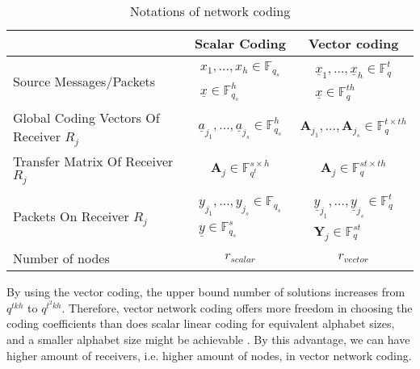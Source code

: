 \begin{table}[H]
\caption{Notations of network coding}

\label{tab:notations} 

\begin{tabular}{|>{\centering}p{0.2\paperwidth}|c|c|}
\hline 
 & Scalar Coding & Vector coding\tabularnewline
\hline 
\hline 
Source Messages/Packets & $\begin{array}{c}
x_{1},\ldots,x_{h}\in\ensuremath{\mathbb{F}}_{q_{s}}\\
\underline{x}\in\ensuremath{\mathbb{F}}_{q_{s}}^{h}
\end{array}$ & $\begin{array}{c}
\underline{x}_{1},\ldots,\underline{x}_{h}\in\ensuremath{\mathbb{F}}_{q}^{t}\\
\underline{x}\in\ensuremath{\mathbb{F}}_{q}^{th}
\end{array}$\tabularnewline
\hline 
Global Coding Vectors Of Receiver $R_{j}$ & $\underline{a}_{j_{1}},\ldots,\underline{a}_{j_{s}}\in\ensuremath{\mathbb{F}}_{q_{s}}^{h}$ & $\boldsymbol{A}_{j_{1}},\ldots,\boldsymbol{A}_{j_{s}}\in\ensuremath{\mathbb{F}}_{q}^{t\times th}$\tabularnewline
\hline 
Transfer Matrix Of Receiver $R_{j}$ & $\boldsymbol{A}_{j}\in\ensuremath{\mathbb{F}}_{q^{t}}^{s\times h}$ & $\boldsymbol{A}_{j}\in\ensuremath{\mathbb{F}}_{q}^{st\times th}$\tabularnewline
\hline 
Packets On Receiver $R_{j}$ & $\begin{array}{c}
y_{j_{1}},\ldots,y_{j_{s}}\in\ensuremath{\mathbb{F}}_{q_{s}}\\
\underline{y}\in\ensuremath{\mathbb{F}}_{q_{s}}^{s}
\end{array}$ & $\begin{array}{c}
\underline{y}_{j_{1}},\ldots,\underline{y}_{j_{s}}\in\ensuremath{\mathbb{F}}_{q}^{t}\\
\boldsymbol{Y}_{j}\in\ensuremath{\mathbb{F}}_{q}^{st}
\end{array}$\tabularnewline
\hline 
Number of nodes & $r_{scalar}$ & $r_{vector}$\tabularnewline
\hline 
\end{tabular}
\end{table}

\begin{rem}
By using the vector coding, the upper bound number of solutions increases
from $q^{tkh}$ to $q^{t^{2}kh}$. Therefore, vector network coding
offers more freedom in choosing the coding coefficients than does
scalar linear coding for equivalent alphabet sizes, and a smaller
alphabet size might be achievable \cite{Ebrahimi:2011}. By this advantage,
we can have higher amount of receivers, i.e. higher amount of nodes,
in vector network coding.
\end{rem}


